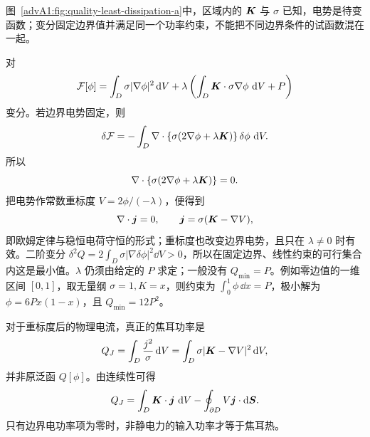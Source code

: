 \begin{advsolution}
\begin{qualityfigure}
\label{advA1:fig:quality-least-dissipation-a}
\end{qualityfigure}
图~\ref{advA1:fig:quality-least-dissipation-a}中，区域内的 $\bm{K}$ 与 $\sigma$ 已知，电势是待变函数；变分固定边界值并满足同一个功率约束，不能把不同边界条件的试函数混在一起。

对
\[
 \mathcal F[\phi]=\int_D\sigma|\nabla\phi|^2\mathop{}\!\mathrm d V
 +\lambda\left(\int_D\bm{K}\cdot\sigma\nabla\phi\,\mathop{}\!\mathrm d V+P\right)
\]
变分。若边界电势固定，则
\[
 \delta\mathcal F
 =-\int_D\nabla\cdot\{\sigma(2\nabla\phi+\lambda\bm{K})\}
 \,\delta\phi\,\mathop{}\!\mathrm d V .
\]
所以
\[
 \nabla\cdot\{\sigma(2\nabla\phi+\lambda\bm{K})\}=0.
\]
把电势作常数重标度 $V=2\phi/(-\lambda)$，便得到
\[
 \nabla\cdot\bm{j}=0,\qquad
 \bm{j}=\sigma(\bm{K}-\nabla V),
\]
即欧姆定律与稳恒电荷守恒的形式；重标度也改变边界电势，且只在 $\lambda\ne0$ 时有效。二阶变分
$\delta^2Q=2\int_D\sigma|\nabla\delta\phi|^2\dd V>0$，所以在固定边界、线性约束的可行集合内这是最小值。$\lambda$ 仍须由给定的 $P$ 求定；一般没有 $Q_{\min}=P$。例如零边值的一维区间 $[0,1]$，取无量纲 $\sigma=1,K=x$，则约束为 $\int_0^1\phi\,\dd x=P$，极小解为 $\phi=6Px(1-x)$，且 $Q_{\min}=12P^2$。

对于重标度后的物理电流，真正的焦耳功率是
\[
 Q_J=\int_D\frac{j^2}{\sigma}\mathop{}\!\mathrm d V
 =\int_D\sigma|\bm{K}-\nabla V|^2\mathop{}\!\mathrm d V,
\]
并非原泛函 $Q[\phi]$。由连续性可得
\[
 Q_J=\int_D\bm{K}\cdot\bm{j}\,\mathop{}\!\mathrm d V
 -\oint_{\partial D}V\bm{j}\cdot\mathop{}\!\mathrm d\bm{S}.
\]
只有边界电功率项为零时，非静电力的输入功率才等于焦耳热。
\end{advsolution}

